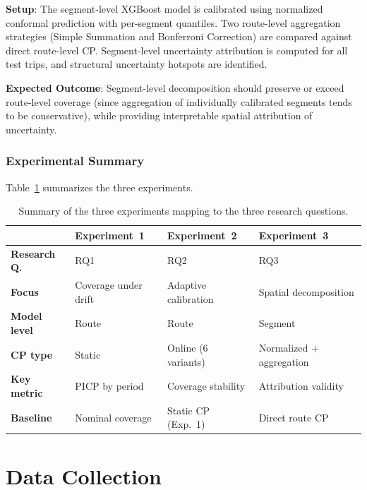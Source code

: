 \textbf{Setup}: The segment-level XGBoost model is calibrated using normalized conformal prediction with per-segment quantiles. Two route-level aggregation strategies (Simple Summation and Bonferroni Correction) are compared against direct route-level CP. Segment-level uncertainty attribution is computed for all test trips, and structural uncertainty hotspots are identified.

\textbf{Expected Outcome}: Segment-level decomposition should preserve or exceed route-level coverage (since aggregation of individually calibrated segments tends to be conservative), while providing interpretable spatial attribution of uncertainty.

\subsubsection{Experimental Summary}

Table~\ref{tab:experimental_matrix} summarizes the three experiments.

\begin{table}[htbp]
\centering
\caption{Summary of the three experiments mapping to the three research questions.}
\label{tab:experimental_matrix}
\begin{tabular}{llll}
\toprule
& \textbf{Experiment~1} & \textbf{Experiment~2} & \textbf{Experiment~3} \\
\midrule
\textbf{Research Q.} & RQ1 & RQ2 & RQ3 \\
\textbf{Focus} & Coverage under drift & Adaptive calibration & Spatial decomposition \\
\textbf{Model level} & Route & Route & Segment \\
\textbf{CP type} & Static & Online (6 variants) & Normalized + aggregation \\
\textbf{Key metric} & PICP by period & Coverage stability & Attribution validity \\
\textbf{Baseline} & Nominal coverage & Static CP (Exp.~1) & Direct route CP \\
\bottomrule
\end{tabular}
\end{table}


\section{Data Collection}
\label{sec:data_collection}

